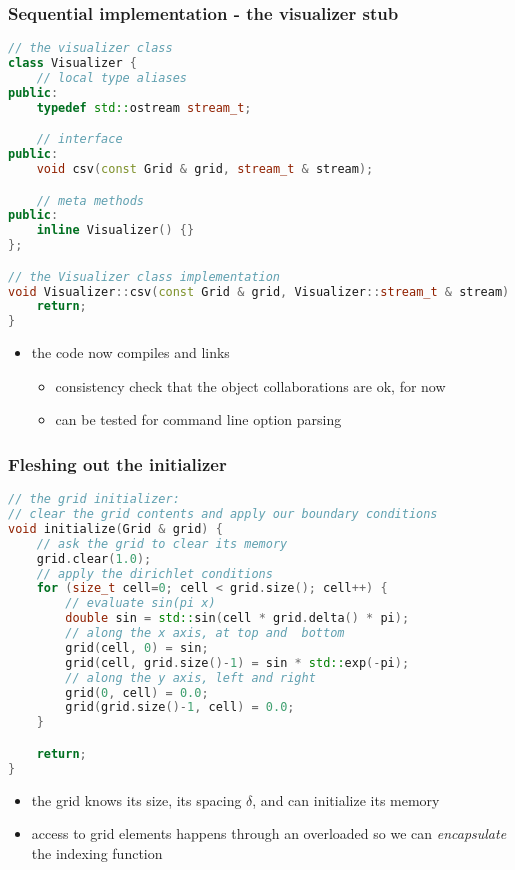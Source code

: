 \begin{frame}[fragile]
%
  \frametitle{Sequential implementation - the visualizer stub}
%
  \begin{lstlisting}[language=c++,name=seq:frame, firstnumber=97]
// the visualizer class
class Visualizer {
    // local type aliases
public:
    typedef std::ostream stream_t;

    // interface
public:
    void csv(const Grid & grid, stream_t & stream);

    // meta methods
public:
    inline Visualizer() {}
};

// the Visualizer class implementation
void Visualizer::csv(const Grid & grid, Visualizer::stream_t & stream) {
    return;
}
  \end{lstlisting}
%

\begin{itemize}
\item the code now compiles and links
  \begin{itemize}
  \item consistency check that the object collaborations are ok, for now
  \item can be tested for command line option parsing
  \end{itemize}
\end{itemize}
% 
\end{frame}

\begin{frame}[fragile]
%
  \frametitle{Fleshing out the initializer}
%
  \begin{lstlisting}[language=c++,name=seq:initializer]
// the grid initializer:
// clear the grid contents and apply our boundary conditions 
void initialize(Grid & grid) {
    // ask the grid to clear its memory
    grid.clear(1.0);
    // apply the dirichlet conditions
    for (size_t cell=0; cell < grid.size(); cell++) {
        // evaluate sin(pi x)
        double sin = std::sin(cell * grid.delta() * pi);
        // along the x axis, at top and  bottom
        grid(cell, 0) = sin;
        grid(cell, grid.size()-1) = sin * std::exp(-pi);
        // along the y axis, left and right
        grid(0, cell) = 0.0;
        grid(grid.size()-1, cell) = 0.0;
    }

    return;
}
  \end{lstlisting}
%
  \begin{itemize}
  \item the grid knows its size, its spacing $\delta$, and can initialize its memory
  \item access to grid elements happens through an overloaded  so we can
    {\em encapsulate} the indexing function
  \end{itemize}
%
\end{frame}

